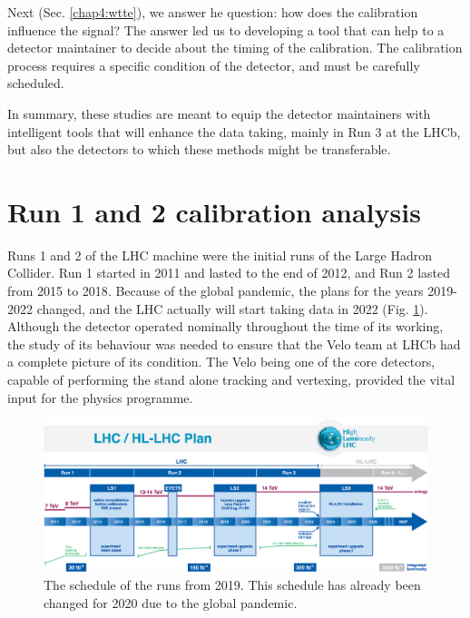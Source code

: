 Next (Sec. \ref{chap4:wtte}), we answer he question: how does the calibration influence the signal? The answer led us to developing a tool that can help to a detector maintainer to decide about the timing of the calibration.
The calibration process requires a specific condition of the detector, and must be carefully scheduled.

In summary, these studies are meant to equip the detector maintainers with intelligent tools that will enhance the data taking, mainly in Run 3 at the LHCb, but also the detectors to which these methods might be transferable.





\section{Run 1 and 2 calibration analysis}
\label{chap4:run12}

Runs 1 and 2 of the LHC machine were the initial runs of the Large Hadron Collider. Run 1 started in 2011 and lasted to the end of 2012, and Run 2 lasted from 2015 to 2018\cite{Hoecker:2236645}.
Because of the global pandemic, the plans for the years 2019-2022 changed, and the LHC actually will start taking data in 2022 (Fig. \ref{plot:lhc_schedule}).
Although the detector operated nominally throughout the time of its working, the study of its behaviour was needed to ensure that the Velo team at LHCb had a complete picture of its condition. The Velo being one of the core detectors, capable of performing the stand alone tracking and vertexing, provided the vital input for the physics programme.

\begin{figure}
    \centering
    \includegraphics[width=0.9\linewidth]{figures/chapter4/lhc_schedule.png}
    \caption{The schedule of the runs from 2019. This schedule has already been changed for 2020 due to the global pandemic.}
    \label{plot:lhc_schedule}
\end{figure}

